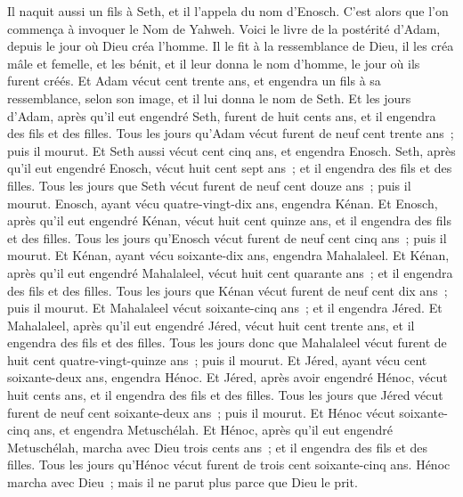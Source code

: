 \begin{multicols}{2}
Il naquit aussi un fils à Seth, et il l'appela du nom d'Enosch. C'est alors que l'on commença à invoquer le Nom de Yahweh.
\VerseOne{}Voici le livre de la postérité d'Adam, depuis le jour où Dieu créa l'homme. Il le fit à la ressemblance de Dieu,
il les créa mâle et femelle, et les bénit, et il leur donna le nom d'homme, le jour où ils furent créés.
Et Adam vécut cent trente ans, et engendra un fils à sa ressemblance, selon son image, et il lui donna le nom de Seth.
Et les jours d'Adam, après qu'il eut engendré Seth, furent de huit cents ans, et il engendra des fils et des filles.
Tous les jours qu'Adam vécut furent de neuf cent trente ans~; puis il mourut.
Et Seth aussi vécut cent cinq ans, et engendra Enosch.
Seth, après qu'il eut engendré Enosch, vécut huit cent sept ans~; et il engendra des fils et des filles.
Tous les jours que Seth vécut furent de neuf cent douze ans~; puis il mourut.
Enosch, ayant vécu quatre-vingt-dix ans, engendra Kénan.
Et Enosch, après qu'il eut engendré Kénan, vécut huit cent quinze ans, et il engendra des fils et des filles.
Tous les jours qu'Enosch vécut furent de neuf cent cinq ans~; puis il mourut.
Et Kénan, ayant vécu soixante-dix ans, engendra Mahalaleel.
Et Kénan, après qu'il eut engendré Mahalaleel, vécut huit cent quarante ans~; et il engendra des fils et des filles.
Tous les jours que Kénan vécut furent de neuf cent dix ans~; puis il mourut.
Et Mahalaleel vécut soixante-cinq ans~; et il engendra Jéred.
Et Mahalaleel, après qu'il eut engendré Jéred, vécut huit cent trente ans, et il engendra des fils et des filles.
Tous les jours donc que Mahalaleel vécut furent de huit cent quatre-vingt-quinze ans~; puis il mourut.
Et Jéred, ayant vécu cent soixante-deux ans, engendra Hénoc.
Et Jéred, après avoir engendré Hénoc, vécut huit cents ans, et il engendra des fils et des filles.
Tous les jours que Jéred vécut furent de neuf cent soixante-deux ans~; puis il mourut.
Et Hénoc vécut soixante-cinq ans, et engendra Metuschélah.
Et Hénoc, après qu'il eut engendré Metuschélah, marcha avec Dieu trois cents ans~; et il engendra des fils et des filles.
Tous les jours qu'Hénoc vécut furent de trois cent soixante-cinq ans.
Hénoc marcha avec Dieu~; mais il ne parut plus parce que Dieu le prit.

\end{multicols}

